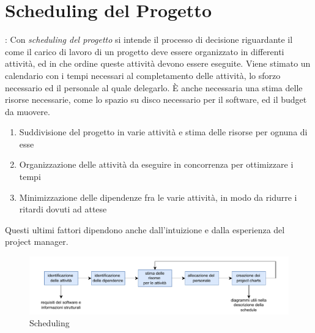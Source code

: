 \documentclass[10pt, letterpaper]{report}
\begin{document}
\section{Scheduling del Progetto}
 : Con \textit{scheduling del progetto} si intende il processo di decisione riguardante 
il come il carico di lavoro di un progetto deve essere organizzato in differenti attività, ed 
in che ordine queste attività devono essere eseguite.\acc 
Viene stimato un calendario con i tempi necessari al completamento delle attività, lo sforzo 
necessario ed il personale al quale delegarlo. È anche necessaria una stima delle risorse 
necessarie, come lo spazio su disco necessario per il software, ed il budget da 
muovere.\begin{enumerate}
    \item Suddivisione del progetto in varie attività e stima delle risorse per ognuna di esse 
    \item Organizzazione delle attività da eseguire in concorrenza per ottimizzare i tempi 
    \item Minimizzazione delle dipendenze fra le varie attività, in modo da ridurre i 
    ritardi dovuti ad attese 
\end{enumerate}
Questi ultimi fattori dipendono anche dall'intuizione e dalla esperienza del project manager.
\begin{center}
    \begin{figure}[h!]
        \centering 
        \includegraphics[width=1\textwidth ]{images/projectScheduling.pdf}
        \caption{Scheduling}
    \end{figure}\end{center}
\end{document}
